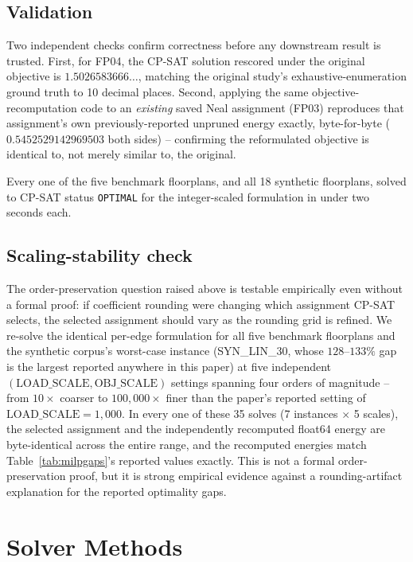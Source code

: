 \documentclass[11pt]{article}
\begin{document}
\subsection{Validation}
Two independent checks confirm correctness before any downstream result is trusted. First, for FP04, the CP-SAT solution rescored under the original objective is $1.5026583666\ldots$, matching the original study's exhaustive-enumeration ground truth to 10 decimal places. Second, applying the same objective-recomputation code to an \emph{existing} saved Neal assignment (FP03) reproduces that assignment's own previously-reported unpruned energy exactly, byte-for-byte ($0.5452529142969503$ both sides) -- confirming the reformulated objective is identical to, not merely similar to, the original.

Every one of the five benchmark floorplans, and all 18 synthetic floorplans, solved to CP-SAT status \texttt{OPTIMAL} for the integer-scaled formulation in under two seconds each.

\subsection{Scaling-stability check}
\label{sec:scalingstability}
The order-preservation question raised above is testable empirically even without a formal proof: if coefficient rounding were changing which assignment CP-SAT selects, the selected assignment should vary as the rounding grid is refined. We re-solve the identical per-edge formulation for all five benchmark floorplans and the synthetic corpus's worst-case instance (SYN\_LIN\_30, whose $128$--$133\%$ gap is the largest reported anywhere in this paper) at five independent $(\text{LOAD\_SCALE}, \text{OBJ\_SCALE})$ settings spanning four orders of magnitude -- from $10\times$ coarser to $100{,}000\times$ finer than the paper's reported setting of $\text{LOAD\_SCALE}=1{,}000$. In every one of these 35 solves (7 instances $\times$ 5 scales), the selected assignment and the independently recomputed float64 energy are byte-identical across the entire range, and the recomputed energies match Table~\ref{tab:milpgaps}'s reported values exactly. This is not a formal order-preservation proof, but it is strong empirical evidence against a rounding-artifact explanation for the reported optimality gaps.

\section{Solver Methods}
\end{document}
